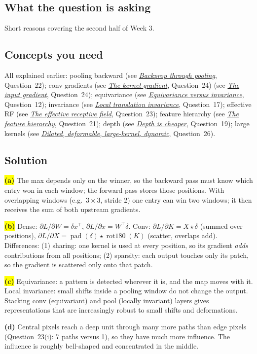 \documentclass[12pt,a4paper]{article}
\newcommand{\seeconcept}[3]{(see \hyperref[#1]{\textit{#2}}, Question~#3)}
\newcommand{\rot}{\operatorname{rot180}}
\newcommand{\hlq}[1]{{\setlength{\fboxsep}{1.5pt}\colorbox{yellow}{#1}}}
\begin{document}
\subsection*{What the question is asking}
Short reasons covering the second half of Week 3.

\subsection*{Concepts you need}
All explained earlier: pooling backward \seeconcept{c:poolback}{Backprop through pooling}{22}; conv gradients \seeconcept{c:convgradK}{The kernel gradient}{24} \seeconcept{c:convgradX}{The input gradient}{24}; equivariance \seeconcept{c:equivariance}{Equivariance versus invariance}{12}; invariance \seeconcept{c:invariance}{Local translation invariance}{17}; effective RF \seeconcept{c:effrf}{The effective receptive field}{23}; feature hierarchy \seeconcept{c:hierarchy}{The feature hierarchy}{21}; depth \seeconcept{c:depth}{Depth is cheaper}{19}; large kernels \seeconcept{c:convvariants}{Dilated, deformable, large-kernel, dynamic}{26}.

\subsection*{Solution}
\hlq{\textbf{(a)}} The max depends only on the winner, so the backward pass must know which entry won in each window; the forward pass stores those positions. With overlapping windows (e.g.\ $3\times3$, stride 2) one entry can win two windows; it then receives the sum of both upstream gradients.

\hlq{\textbf{(b)}} Dense: $\partial L/\partial W=\delta x^\top$, $\partial L/\partial x=W^\top\delta$. Conv: $\partial L/\partial K=X\star\delta$ (summed over positions), $\partial L/\partial X=\operatorname{pad}(\delta)\star\rot(K)$ (scatter, overlaps add). Differences: (1) sharing: one kernel is used at every position, so its gradient \emph{adds} contributions from all positions; (2) sparsity: each output touches only its patch, so the gradient is scattered only onto that patch.

\hlq{\textbf{(c)}} Equivariance: a pattern is detected wherever it is, and the map moves with it. Local invariance: small shifts inside a pooling window do not change the output. Stacking conv (equivariant) and pool (locally invariant) layers gives representations that are increasingly robust to small shifts and deformations.

\textbf{(d)} Central pixels reach a deep unit through many more paths than edge pixels (Question~23(i): 7 paths versus 1), so they have much more influence. The influence is roughly bell-shaped and concentrated in the middle.
\end{document}
